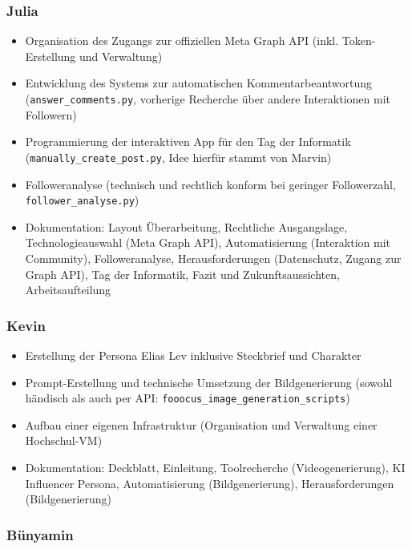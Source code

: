 \documentclass[a4paper,12pt]{article}
\begin{document}
\subsubsection*{Julia}

\begin{itemize}
    \item Organisation des Zugangs zur offiziellen Meta Graph API (inkl. Token-Erstellung und Verwaltung)
    \item Entwicklung des Systems zur automatischen Kommentarbeantwortung (\texttt{answer\_comments.py}, vorherige Recherche über andere Interaktionen mit Followern)
    \item Programmierung der interaktiven App für den Tag der Informatik (\texttt{manually\_create\_post.py}, Idee hierfür stammt von Marvin)
    \item Followeranalyse (technisch und rechtlich konform bei geringer Followerzahl, \texttt{follower\_analyse.py})
    \item Dokumentation: Layout Überarbeitung, Rechtliche Ausgangslage, Technologieauswahl (Meta Graph API), Automatisierung (Interaktion mit Community), Followeranalyse, Herausforderungen (Datenschutz, Zugang zur Graph API), Tag der Informatik, Fazit und Zukunftsaussichten, Arbeitsaufteilung
\end{itemize}

\subsubsection*{Kevin}

\begin{itemize}
    \item Erstellung der Persona Elias Lev inklusive Steckbrief und Charakter
    \item Prompt-Erstellung und technische Umsetzung der Bildgenerierung (sowohl händisch als auch per API: \texttt{fooocus\_image\_generation\_scripts})
    \item Aufbau einer eigenen Infrastruktur (Organisation und Verwaltung einer Hochschul-VM)
    \item Dokumentation: Deckblatt, Einleitung, Toolrecherche (Videogenerierung), KI Influencer Persona, Automatisierung (Bildgenerierung), Herausforderungen (Bildgenerierung)
\end{itemize}

\subsubsection*{Bünyamin}
\end{document}
